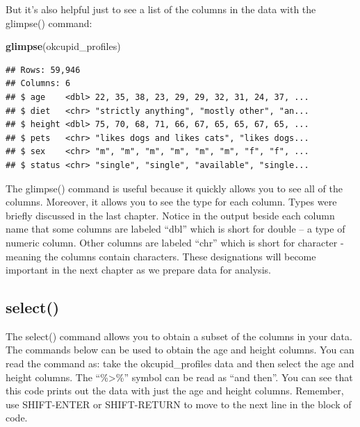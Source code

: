 \documentclass[
]{krantz}
\makeatletter
\newenvironment{Shaded}{\begin{snugshade}}{\end{snugshade}}
\newcommand{\KeywordTok}[1]{\textcolor[rgb]{0.27,0.27,0.27}{\textbf{#1}}}
\newcommand{\NormalTok}[1]{#1}
\newcommand{\OperatorTok}[1]{\textcolor[rgb]{0.43,0.43,0.43}{\textbf{#1}}}
\newcommand{\StringTok}[1]{\textcolor[rgb]{0.5,0.5,0.5}{#1}}
\newenvironment{kframe}{%
\medskip{}
\setlength{\fboxsep}{.8em}
 \def\at@end@of@kframe{}%
 \ifinner\ifhmode%
  \def\at@end@of@kframe{\end{minipage}}%
  \begin{minipage}{\columnwidth}%
 \fi\fi%
 \def\FrameCommand##1{\hskip\@totalleftmargin \hskip-\fboxsep
 \colorbox{shadecolor}{##1}\hskip-\fboxsep
     \hskip-\linewidth \hskip-\@totalleftmargin \hskip\columnwidth}%
 \MakeFramed {\advance\hsize-\width
   \@totalleftmargin\z@ \linewidth\hsize
   \@setminipage}}%
 {\par\unskip\endMakeFramed%
 \at@end@of@kframe}
\renewenvironment{Shaded}{\begin{kframe}}{\end{kframe}}
\makeatother
\begin{document}
But it's also helpful just to see a list of the columns in the data with the glimpse() command:

\begin{Shaded}
\begin{Highlighting}[]
\KeywordTok{glimpse}\NormalTok{(okcupid_profiles)}
\end{Highlighting}
\end{Shaded}

\begin{verbatim}
## Rows: 59,946
## Columns: 6
## $ age    <dbl> 22, 35, 38, 23, 29, 29, 32, 31, 24, 37, ...
## $ diet   <chr> "strictly anything", "mostly other", "an...
## $ height <dbl> 75, 70, 68, 71, 66, 67, 65, 65, 67, 65, ...
## $ pets   <chr> "likes dogs and likes cats", "likes dogs...
## $ sex    <chr> "m", "m", "m", "m", "m", "m", "f", "f", ...
## $ status <chr> "single", "single", "available", "single...
\end{verbatim}

The glimpse() command is useful because it quickly allows you to see all of the columns. Moreover, it allows you to see the type for each column. Types were briefly discussed in the last chapter. Notice in the output beside each column name that some columns are labeled ``dbl'' which is short for double -- a type of numeric column. Other columns are labeled ``chr'' which is short for character - meaning the columns contain characters. These designations will become important in the next chapter as we prepare data for analysis.

\hypertarget{select}{%
\subsection{select()}\label{select}}

The select() command allows you to obtain a subset of the columns in your data. The commands below can be used to obtain the age and height columns. You can read the command as: take the okcupid\_profiles data and then select the age and height columns. The ``\%\textgreater\%'' symbol can be read as ``and then''. You can see that this code prints out the data with just the age and height columns. Remember, use SHIFT-ENTER or SHIFT-RETURN to move to the next line in the block of code.

\begin{Shaded}
\end{Shaded}
\end{document}
